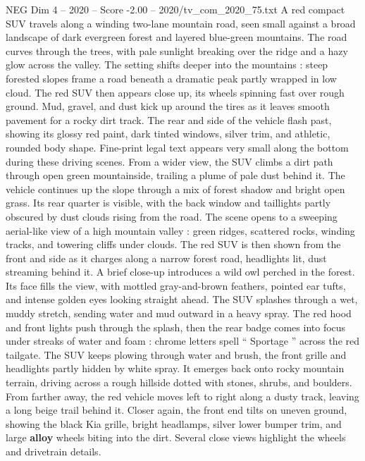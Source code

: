 \begin{textsample}{NEG Dim 4 – 2020 – Score -2.00 – 2020/tv\_com\_2020\_75.txt}  \label{ex:f4_neg_083}
A red compact SUV travels along a winding two-lane mountain road, seen small against a broad landscape of dark evergreen forest and layered blue-green mountains.
The road curves through the trees, with pale sunlight breaking over the ridge and a hazy glow across the valley.
The setting shifts deeper into the mountains : steep forested slopes frame a road beneath a dramatic peak partly wrapped in low cloud.
The red SUV then appears close up, its wheels spinning fast over rough ground.
Mud, gravel, and dust kick up around the tires as it leaves smooth pavement for a rocky dirt track.
The rear and side of the vehicle flash past, showing its glossy red paint, dark tinted windows, silver trim, and athletic, rounded body shape.
Fine-print legal text appears very small along the bottom during these driving scenes.
From a wider view, the SUV climbs a dirt path through open green mountainside, trailing a plume of pale dust behind it.
The vehicle continues up the slope through a mix of forest shadow and bright open grass.
Its rear quarter is visible, with the back window and taillights partly obscured by dust clouds rising from the road.
The scene opens to a sweeping aerial-like view of a high mountain valley : green ridges, scattered rocks, winding tracks, and towering cliffs under clouds.
The red SUV is then shown from the front and side as it charges along a narrow forest road, headlights lit, dust streaming behind it.
A brief close-up introduces a wild owl perched in the forest.
Its face fills the view, with mottled gray-and-brown feathers, pointed ear tufts, and intense golden eyes looking straight ahead.
The SUV splashes through a wet, muddy stretch, sending water and mud outward in a heavy spray.
The red hood and front lights push through the splash, then the rear badge comes into focus under streaks of water and foam : chrome letters spell “ Sportage ” across the red tailgate.
The SUV keeps plowing through water and brush, the front grille and headlights partly hidden by white spray.
It emerges back onto rocky mountain terrain, driving across a rough hillside dotted with stones, shrubs, and boulders.
From farther away, the red vehicle moves left to right along a dusty track, leaving a long beige trail behind it.
Closer again, the front end tilts on uneven ground, showing the black Kia grille, bright headlamps, silver lower bumper trim, and large \textbf{alloy} wheels biting into the dirt.
Several close views highlight the wheels and drivetrain details.

\end{textsample}
